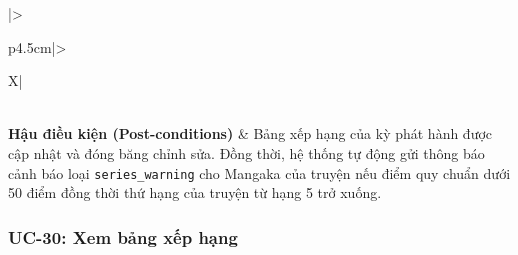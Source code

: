 \begin{table}[H]
\begin{tabularx}{\textwidth}{|>{\raggedright\arraybackslash\bfseries}p{4.5cm}|>{\raggedright\arraybackslash}X|}
\begin{minipage}[t]{\linewidth}
\begin{itemize}[leftmargin=*]
    \end{itemize}
\end{minipage} \\ \hline
\textbf{Hậu điều kiện (Post-conditions)} & Bảng xếp hạng của kỳ phát hành được cập nhật và đóng băng chỉnh sửa. Đồng thời, hệ thống tự động gửi thông báo cảnh báo loại \texttt{series\_warning} cho Mangaka của truyện nếu điểm quy chuẩn dưới 50 điểm đồng thời thứ hạng của truyện từ hạng 5 trở xuống. \\ \hline
\end{tabularx}
\caption{Đặc tả UC-29: Nhập dữ liệu bình chọn}
\label{tab:uc29}
\end{table}

\subsubsection{UC-30: Xem bảng xếp hạng}\label{subsubsec:uc30_view_ranking}
